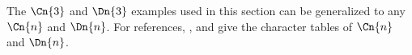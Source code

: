 
The $\Cn{3}$ and $\Dn{3}$ examples used in this section can be
generalized to any $\Cn{n}$ and $\Dn{n}$. For references,
,  and
 give the character tables of $\Cn{n}$ and
$\Dn{n}$.

%
%
